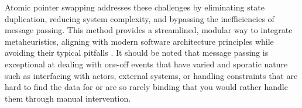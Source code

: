 Atomic pointer swapping addresses these challenges by eliminating state
duplication, reducing system complexity, and bypassing the inefficiencies of
message passing. This method provides a streamlined, modular way to integrate
metaheuristics, aligning with modern software architecture principles while
avoiding their typical pitfalls \citep{richards_fundamentals_2020}. It should
be noted that message passing is exceptional at dealing with one-off events that
have varied and sporatic nature such as interfacing with actors, external
systems, or handling constraints that are hard to find the data for or are 
so rarely binding that you would rather handle them through manual intervention.

